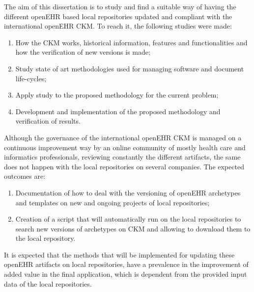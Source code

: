 \documentclass[mim_thesis.tex]{subfiles}
\begin{document}
The aim of this dissertation is to study and find a suitable way of having the different openEHR based local repositories updated and compliant with the international openEHR CKM. To reach it, the following studies were made:

\begin{enumerate}[noitemsep]
\item How the CKM works, historical information, features and functionalities and how the verification of new versions is made;
\item Study state of art methodologies used for managing software and document life-cycles;
\item Apply study to the proposed methodology for the current problem;
\item Development and implementation of the proposed methodology and verification of results. 
\end{enumerate}

Although the governance of the international openEHR CKM is managed on a continuous improvement way by an online community of mostly health care and informatics professionals, reviewing constantly the different artifacts, the same does not happen with the local repositories on several companies. The expected outcomes are:

\begin{enumerate}[noitemsep]
\item Documentation of how to deal with the versioning of openEHR archetypes and templates on new and ongoing projects of local repositories;
\item Creation of a script that will automatically run on the local repositories to search new versions of archetypes on CKM and allowing to download them to the local repository.
\end{enumerate}

It is expected that the methods that will be implemented for updating these openEHR artifacts on local repositories, have a prevalence in the improvement of added value in the final application, which is dependent from the provided input data of the local repositories. 
\end{document}
